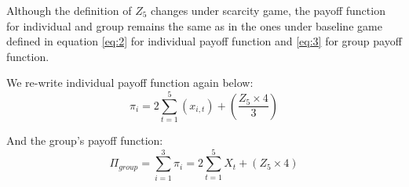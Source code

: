 \noindent Although the definition of $Z_5$ changes under scarcity game, the payoff function for individual and group remains the same as in the ones under baseline game defined in equation \ref{eq:2} for individual payoff function and \ref{eq:3} for group payoff function.

\noindent We re-write individual payoff function again below:
\begin{equation*}
    \pi_{i}=2\sum_{t=1}^{5} (x_{i,t})+\left( \frac{Z_{5} \times 4}{3} \right)
\end{equation*}

\noindent And the group's payoff function:
\begin{equation*}
    \Pi_{group} = \sum_{i=1}^{3} \pi_{i} = 2 \sum_{t=1}^{5} X_{t} + \left(Z_5 \times 4 \right)
\end{equation*}
